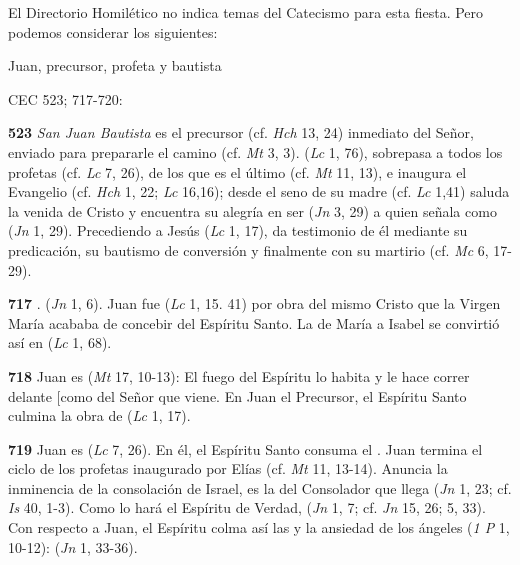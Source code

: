 \begin{body}
\begin{body}
{El Directorio Homilético no indica temas del Catecismo para esta fiesta. Pero podemos considerar los siguientes:

Juan, precursor, profeta y bautista

CEC 523; 717-720:

\textbf{523} \emph{San Juan Bautista} es el precursor (cf. \emph{Hch} 13, 24) inmediato del Señor, enviado para prepararle el camino (cf. \emph{Mt} 3, 3).  (\emph{Lc} 1, 76), sobrepasa a todos los profetas (cf. \emph{Lc} 7, 26), de los que es el último (cf. \emph{Mt} 11, 13), e inaugura el Evangelio (cf. \emph{Hch} 1, 22; \emph{Lc} 16,16); desde el seno de su madre (cf. \emph{Lc} 1,41) saluda la venida de Cristo y encuentra su alegría en ser  (\emph{Jn} 3, 29) a quien señala como  (\emph{Jn} 1, 29). Precediendo a Jesús  (\emph{Lc} 1, 17), da testimonio de él mediante su predicación, su bautismo de conversión y finalmente con su martirio (cf. \emph{Mc} 6, 17-29).

\textbf{717} . (\emph{Jn} 1, 6). Juan fue  (\emph{Lc} 1, 15. 41) por obra del mismo Cristo que la Virgen María acababa de concebir del Espíritu Santo. La  de María a Isabel se convirtió así en  (\emph{Lc} 1, 68).

\textbf{718} Juan es  (\emph{Mt} 17, 10-13): El fuego del Espíritu lo habita y le hace correr delante {[}como \textquote{precursor}{]} del Señor que viene. En Juan el Precursor, el Espíritu Santo culmina la obra de  (\emph{Lc} 1, 17).

\textbf{719} Juan es  (\emph{Lc} 7, 26). En él, el Espíritu Santo consuma el . Juan termina el ciclo de los profetas inaugurado por Elías (cf. \emph{Mt} 11, 13-14). Anuncia la inminencia de la consolación de Israel, es la  del Consolador que llega (\emph{Jn} 1, 23; cf. \emph{Is} 40, 1-3). Como lo hará el Espíritu de Verdad,  (\emph{Jn} 1, 7; cf. \emph{Jn} 15, 26; 5, 33). Con respecto a Juan, el Espíritu colma así las  y la ansiedad de los ángeles (\emph{1 P} 1, 10-12):  (\emph{Jn} 1, 33-36).

}
\end{body}
\end{body}
